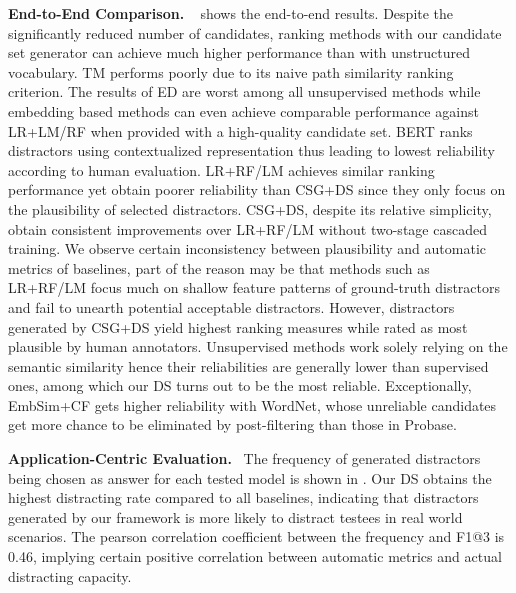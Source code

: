 \textbf{End-to-End Comparison.} ~ shows the end-to-end results.
Despite the significantly reduced number of candidates, ranking methods with our candidate set generator can achieve much higher performance than with unstructured vocabulary. TM performs poorly due to its naive path similarity ranking criterion. The results of ED are worst among all unsupervised methods while embedding based methods can even achieve comparable performance against LR+LM/RF when provided with a high-quality candidate set.
BERT ranks distractors using contextualized representation thus leading to lowest reliability according to human evaluation. 
LR+RF/LM achieves similar ranking performance yet obtain poorer reliability than CSG+DS since they only focus on the plausibility of selected distractors. CSG+DS, despite its relative simplicity, obtain consistent improvements over LR+RF/LM without two-stage cascaded training.
We observe certain inconsistency between plausibility and automatic metrics of baselines, part of the reason may be that methods such as LR+RF/LM focus much on shallow feature patterns of ground-truth distractors and fail to unearth potential acceptable distractors.
However, distractors generated by CSG+DS yield highest ranking measures while rated as most plausible by human annotators. 
Unsupervised methods work solely relying on the semantic similarity hence their reliabilities are generally lower than supervised ones, among which our DS turns out to be the most reliable. Exceptionally, EmbSim+CF gets higher reliability with WordNet, whose unreliable candidates get more chance to be eliminated by post-filtering than those in Probase.

\noindent
\textbf{Application-Centric Evaluation.} ~The frequency of generated distractors being chosen as answer for each tested model is shown in . Our DS obtains the highest distracting rate compared to all baselines, indicating that distractors generated by our framework is more likely to distract testees in real world scenarios. The pearson correlation coefficient between the frequency and F1@3 is 0.46, implying certain positive correlation between automatic metrics and actual distracting capacity.




